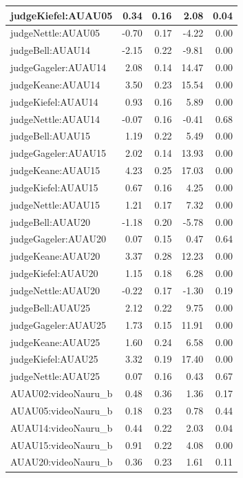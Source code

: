 \documentclass{monashthesis}
\begin{document}
\begin{tabular}{l|r|r|r|r}
\hline
judgeKiefel:AUAU05 & 0.34 & 0.16 & 2.08 & 0.04\\
\hline
judgeNettle:AUAU05 & -0.70 & 0.17 & -4.22 & 0.00\\
\hline
judgeBell:AUAU14 & -2.15 & 0.22 & -9.81 & 0.00\\
\hline
judgeGageler:AUAU14 & 2.08 & 0.14 & 14.47 & 0.00\\
\hline
judgeKeane:AUAU14 & 3.50 & 0.23 & 15.54 & 0.00\\
\hline
judgeKiefel:AUAU14 & 0.93 & 0.16 & 5.89 & 0.00\\
\hline
judgeNettle:AUAU14 & -0.07 & 0.16 & -0.41 & 0.68\\
\hline
judgeBell:AUAU15 & 1.19 & 0.22 & 5.49 & 0.00\\
\hline
judgeGageler:AUAU15 & 2.02 & 0.14 & 13.93 & 0.00\\
\hline
judgeKeane:AUAU15 & 4.23 & 0.25 & 17.03 & 0.00\\
\hline
judgeKiefel:AUAU15 & 0.67 & 0.16 & 4.25 & 0.00\\
\hline
judgeNettle:AUAU15 & 1.21 & 0.17 & 7.32 & 0.00\\
\hline
judgeBell:AUAU20 & -1.18 & 0.20 & -5.78 & 0.00\\
\hline
judgeGageler:AUAU20 & 0.07 & 0.15 & 0.47 & 0.64\\
\hline
judgeKeane:AUAU20 & 3.37 & 0.28 & 12.23 & 0.00\\
\hline
judgeKiefel:AUAU20 & 1.15 & 0.18 & 6.28 & 0.00\\
\hline
judgeNettle:AUAU20 & -0.22 & 0.17 & -1.30 & 0.19\\
\hline
judgeBell:AUAU25 & 2.12 & 0.22 & 9.75 & 0.00\\
\hline
judgeGageler:AUAU25 & 1.73 & 0.15 & 11.91 & 0.00\\
\hline
judgeKeane:AUAU25 & 1.60 & 0.24 & 6.58 & 0.00\\
\hline
judgeKiefel:AUAU25 & 3.32 & 0.19 & 17.40 & 0.00\\
\hline
judgeNettle:AUAU25 & 0.07 & 0.16 & 0.43 & 0.67\\
\hline
AUAU02:videoNauru\_b & 0.48 & 0.36 & 1.36 & 0.17\\
\hline
AUAU05:videoNauru\_b & 0.18 & 0.23 & 0.78 & 0.44\\
\hline
AUAU14:videoNauru\_b & 0.44 & 0.22 & 2.03 & 0.04\\
\hline
AUAU15:videoNauru\_b & 0.91 & 0.22 & 4.08 & 0.00\\
\hline
AUAU20:videoNauru\_b & 0.36 & 0.23 & 1.61 & 0.11\\

\end{tabular}
\end{document}
